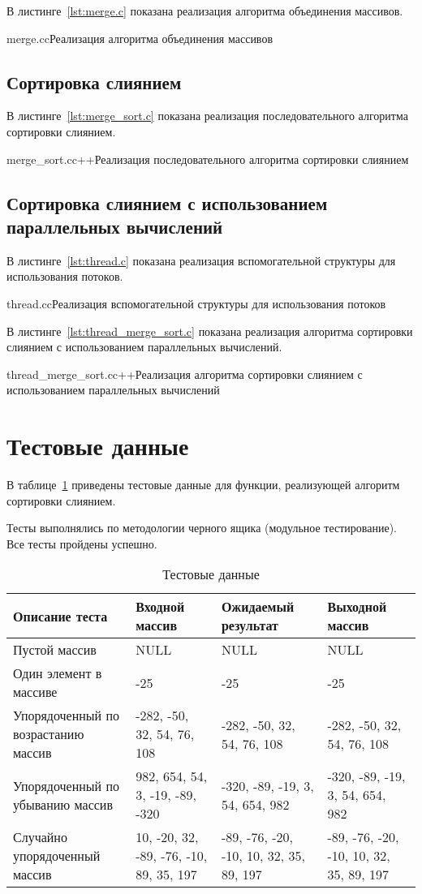 В листинге~\ref{lst:merge.c} показана реализация алгоритма объединения массивов.

{merge.c}{c}{Реализация алгоритма объединения массивов}

\subsection{Сортировка слиянием}

В листинге~\ref{lst:merge_sort.c} показана реализация последовательного алгоритма сортировки слиянием.

{merge_sort.c}{c++}{Реализация последовательного алгоритма сортировки слиянием}

\subsection{Сортировка слиянием с использованием параллельных вычислений}

В листинге~\ref{lst:thread.c} показана реализация вспомогательной структуры для использования потоков.

{thread.c}{c}{Реализация вспомогательной структуры для использования потоков}

В листинге~\ref{lst:thread_merge_sort.c} показана реализация алгоритма сортировки слиянием с использованием параллельных вычислений.

{thread_merge_sort.c}{c++}{Реализация алгоритма сортировки слиянием с использованием параллельных вычислений}

\section{Тестовые данные}

В таблице~\ref{tabular:testsdata} приведены тестовые данные для функции, реализующей алгоритм сортировки слиянием. 

Тесты выполнялись по методологии черного ящика (модульное тестирование). Все тесты пройдены успешно.

\begin{table}[H]
\caption{Тестовые данные}
\label{tabular:testsdata}
\begin{tabular}{|p{3.5cm}|p{4cm}|p{4cm}|p{4cm}|}
\hline
\textbf{Описание теста} & \textbf{Входной массив} & \textbf{Ожидаемый результат} & \textbf{Выходной массив}
\tabularnewline
\hline
Пустой массив & NULL & NULL & NULL
\tabularnewline
\hline
Один элемент в массиве & -25 & -25 & -25
\tabularnewline
\hline
Упорядоченный по возрастанию массив & -282, -50, 32, 54, 76, 108 & -282, -50, 32, 54, 76, 108 & -282, -50, 32, 54, 76, 108
\tabularnewline
\hline
Упорядоченный по убыванию массив & 982, 654, 54, 3, -19, -89, -320 & -320, -89, -19, 3, 54, 654, 982 & -320, -89, -19, 3, 54, 654, 982
\tabularnewline
\hline
Случайно упорядоченный массив & 10, -20, 32, -89, -76, -10, 89, 35, 197 & -89, -76, -20, -10, 10, 32, 35, 89, 197 & -89, -76, -20, -10, 10, 32, 35, 89, 197 \tabularnewline
\hline
\end{tabular}
\end{table}

